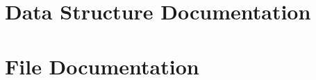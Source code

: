 \documentclass[twoside]{book}
\newcommand{\+}{\discretionary{\mbox{\scriptsize$\hookleftarrow$}}{}{}}
\newcommand{\clearemptydoublepage}{%
    \newpage{\pagestyle{empty}\cleardoublepage}%
  }
\begin{document}
\chapter{Data Structure Documentation}








\chapter{File Documentation}


























  \backmatter
  \newpage
  \clearemptydoublepage
  \printindex
\end{document}
